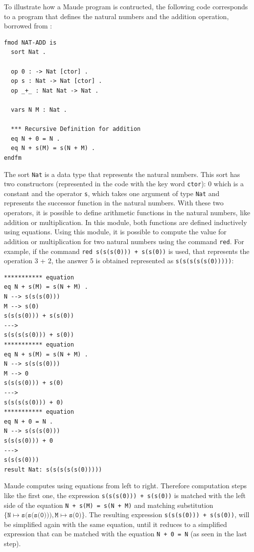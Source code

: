 To illustrate how a Maude program is contructed, the following code corresponds to a program that defines the natural numbers and the addition operation, borrowed from \cite{PeterMaude}: 
\begin{lstlisting}
fmod NAT-ADD is
  sort Nat .

  op 0 : -> Nat [ctor] .
  op s : Nat -> Nat [ctor] .
  op _+_ : Nat Nat -> Nat .

  vars N M : Nat .
    
  *** Recursive Definition for addition
  eq N + 0 = N .
  eq N + s(M) = s(N + M) .
endfm
\end{lstlisting}
The sort \texttt{Nat} is a data type that represents the natural numbers. This sort has two constructors (represented in the code with the key word \texttt{ctor}): 0 which is a constant and the operator \texttt{s}, which takes one argument of type \texttt{Nat} and represents the successor function in the natural numbers. With these two operators, it is possible to define arithmetic functions in the natural numbers, like addition or multiplication. In this module, both functions are defined inductively using equations. Using this module, it is possible to compute the value for addition or multiplication for two natural numbers using the command \texttt{red}. For example, if the command \texttt{red s(s(s(0))) + s(s(0))} is used, that represents the operation 3 + 2, the answer 5 is obtained represented as \texttt{s(s(s(s(s(0)))))}:
\begin{lstlisting}
*********** equation
eq N + s(M) = s(N + M) .
N --> s(s(s(0)))
M --> s(0)
s(s(s(0))) + s(s(0))
--->
s(s(s(s(0))) + s(0))
*********** equation
eq N + s(M) = s(N + M) .
N --> s(s(s(0)))
M --> 0
s(s(s(0))) + s(0)
--->
s(s(s(s(0))) + 0)
*********** equation
eq N + 0 = N .
N --> s(s(s(0)))
s(s(s(0))) + 0
--->
s(s(s(0)))
result Nat: s(s(s(s(s(0)))))
\end{lstlisting}
Maude computes using equations from left to right. Therefore computation steps like the first one, the expression \texttt{s(s(s(0))) + s(s(0))} is matched with the left side of the equation \texttt{N + s(M) = s(N + M)} and matching substitution $\{\texttt{N} \mapsto \texttt{s(s(s(0)))},\texttt{M} \mapsto \texttt{s(0)} \}$. The resulting expression \texttt{s(s(s(0))) + s(s(0))}, will be simplified again with the same equation, until it reduces to a simplified expression that can be matched with the equation \texttt{N + 0 = N} (as seen in the last step).

